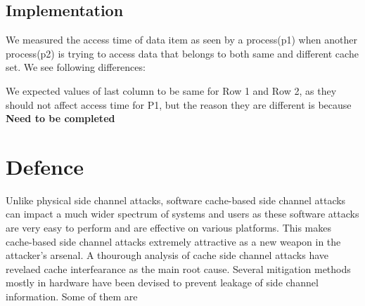 \documentclass[twocolumn]{IEEEtran}
\begin{document}
\subsection {Implementation}
We measured the access time of data item as seen by a process(p1) when another process(p2) is trying to access data that belongs to both same and different cache set. We see following differences:
\begin{center}
\end{center}
We expected values of last column to be same for Row 1 and Row 2, as they should not affect access time for P1, but the reason they are different is because \textbf { Need to be completed }


\section {Defence}

Unlike physical side channel attacks, software cache-based side channel  attacks can impact a much wider spectrum of systems and users as these software attacks are very easy to perform and are effective on various platforms. This makes cache-based side channel attacks extremely attractive as a new weapon in the attacker’s arsenal. A thourough analysis of cache side channel attacks have revelaed cache interfearance as the main root cause. Several mitigation methods mostly in hardware have been devised to prevent leakage of side channel information. Some of them are
\end{document}
